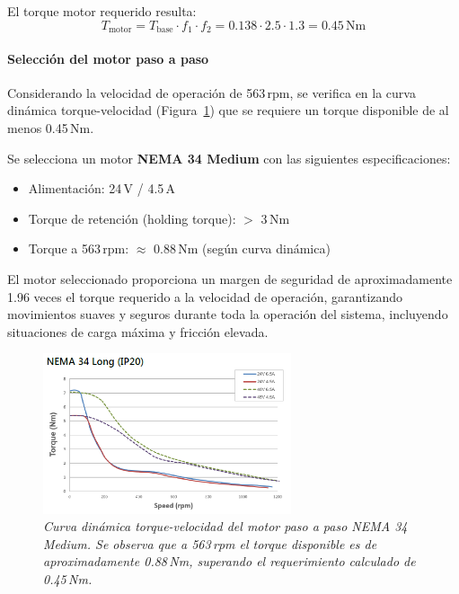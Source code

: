 El torque motor requerido resulta:
\begin{equation}
T_{\text{motor}} = T_{\text{base}} \cdot f_1 \cdot f_2 = 0.138 \cdot 2.5 \cdot 1.3 = 0.45\,\text{Nm}
\label{eq:torque_motor_vertical}
\end{equation}

\paragraph{Selección del motor paso a paso}
Considerando la velocidad de operación de 563\,rpm, se verifica en la curva dinámica torque-velocidad (Figura~\ref{fig:Curva_din_nema34}) que se requiere un torque disponible de al menos 0.45\,Nm.

Se selecciona un motor \textbf{NEMA 34 Medium} con las siguientes especificaciones:
\begin{itemize}
    \item Alimentación: 24\,V / 4.5\,A
    \item Torque de retención (holding torque): $>$ 3\,Nm
    \item Torque a 563\,rpm: $\approx$ 0.88\,Nm (según curva dinámica)
\end{itemize}

El motor seleccionado proporciona un margen de seguridad de aproximadamente 1.96 veces el torque requerido a la velocidad de operación, garantizando movimientos suaves y seguros durante toda la operación del sistema, incluyendo situaciones de carga máxima y fricción elevada.

\begin{figure}[H]
    \centering
    \includegraphics[width=0.65\textwidth]{img/Nema34.png}
    \caption{\textit{Curva dinámica torque-velocidad del motor paso a paso NEMA 34 Medium. Se observa que a 563\,rpm el torque disponible es de aproximadamente 0.88\,Nm, superando el requerimiento calculado de 0.45\,Nm.}}
    \label{fig:Curva_din_nema34}
\end{figure}